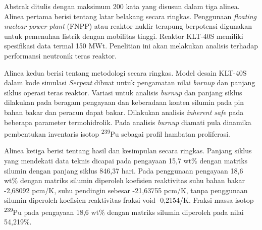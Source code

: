 Abstrak ditulis dengan maksimum 200 kata yang disusun dalam tiga alinea. Alinea pertama berisi tentang latar belakang secara ringkas. Penggunaan \textit{floating nuclear power plant} (FNPP) atau reaktor nuklir terapung berpotensi digunakan untuk pemenuhan listrik dengan mobilitas tinggi. Reaktor KLT-40S memiliki spesifikasi data termal 150 MWt. Penelitian ini akan melakukan analisis terhadap performansi neutronik teras reaktor. 

Alinea kedua berisi tentang metodologi secara ringkas. Model desain KLT-40S dalam kode simulasi \textit{Serpent} dibuat untuk pengamatan nilai \textit{burnup} dan panjang siklus operasi teras reaktor. Variasi untuk analisis \textit{burnup} dan panjang siklus dilakukan pada beragam pengayaan dan keberadaan konten silumin pada pin bahan bakar dan peracun dapat bakar. Dilakukan analisis \textit{inherent safe} pada beberapa parameter termohidrolik. Pada analisis \textit{burnup} diamati pula dinamika pembentukan inventaris isotop \textsuperscript{239}Pu sebagai profil hambatan proliferasi. 

Alinea ketiga berisi tentang hasil dan kesimpulan secara ringkas. Panjang siklus yang mendekati data teknis dicapai pada pengayaan 15,7 wt\% dengan matriks silumin dengan panjang siklus 846,37 hari. Pada penggunaan pengayaan 18,6 wt\% dengan matriks silumin diperoleh koefisien reaktivitas suhu bahan bakar -2,68092 pcm/K, suhu pendingin sebesar -21,63755 pcm/K, tanpa penggunaan silumin diperoleh koefisien reaktivitas fraksi void -0,2154/K. Fraksi massa isotop \textsuperscript{239}Pu pada pengayaan 18,6 wt\% dengan matriks silumin diperoleh pada nilai 54,219\%.


